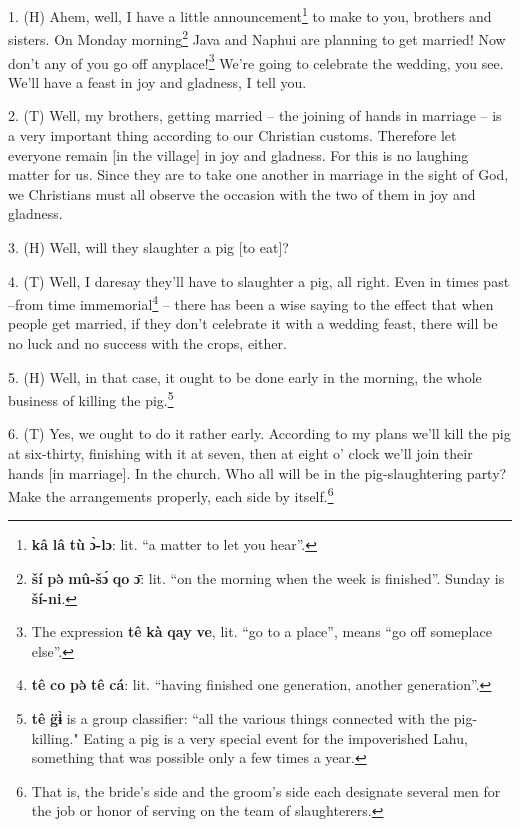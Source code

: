 \setcounter{footnote}{0}

1. (H) Ahem, well, I have a little announcement\footnote{\textbf{kâ} \textbf{lâ} \textbf{tù} \textbf{ɔ̀-lɔ}: lit. ``a matter to let you hear''.} to make to you, brothers and
sisters. On Monday morning\footnote{\textbf{ší} \textbf{pə̀} \textbf{mû-šɔ́} \textbf{qo} \textbf{ɔ̄}: lit. ``on the morning when the week is finished''. Sunday is \textbf{ší-ni}.} Java and Naphui are planning to get married! Now
don't any of you go off anyplace!\footnote{The expression \textbf{tê} \textbf{kà} \textbf{qay} \textbf{ve}, lit. ``go to a place'', means ``go off someplace else''.} We're going to celebrate the wedding, you
see. We'll have a feast in joy and gladness, I tell you.

2. (T) Well, my brothers, getting married -- the joining of hands in marriage --
is a very important thing according to our Christian customs. Therefore let everyone
remain [in the village] in joy and gladness. For this is no laughing matter for
us. Since they are to take one another in marriage in the sight of God, we Christians
must all observe the occasion with the two of them in joy and gladness.

3. (H) Well, will they slaughter a pig [to eat]?

4. (T) Well, I daresay they'll have to slaughter a pig, all right. Even in times
past --from time immemorial\footnote{\textbf{tê} \textbf{co} \textbf{pə̀} \textbf{tê} \textbf{cá}: lit. ``having finished one generation, another generation''.} -- there has been a wise saying to the effect that
when people get married, if they don't celebrate it with a wedding feast, there
will be no luck and no success with the crops, either.

5. (H) Well, in that case, it ought to be done early in the morning, the whole
business of killing the pig.\footnote{\textbf{tê} \textbf{g̈ɨ̀} is a group classifier: ``all the various things connected with the pig-killing." Eating a pig is a very special event for the impoverished Lahu, something that was possible only a few times a year.}

6. (T) Yes, we ought to do it rather early. According to my plans we'll kill the
pig at six-thirty, finishing with it at seven, then at eight o' clock we'll join
their hands [in marriage]. In the church. Who all will be in the pig-slaughtering
party? Make the arrangements properly, each side by itself.\footnote{That is, the bride's side and the groom's side each designate several men for the job or honor of serving on the team of slaughterers.}


